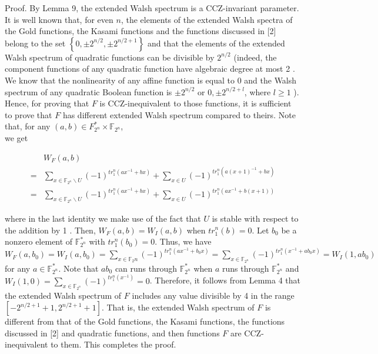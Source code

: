 \documentclass[10pt]{article}
\begin{document}
Proof. By Lemma 9, the extended Walsh spectrum is a CCZ-invariant parameter. It is well known that, for even $n$, the elements of the extended Walsh spectra of the Gold functions, the Kasami functions and the functions discussed in [2] belong to the set $\left\{0, \pm 2^{n / 2}, \pm 2^{n / 2+1}\right\}$ and that the elements of the extended Walsh spectrum of quadratic functions can be divisible by $2^{n / 2}$ (indeed, the component functions of any quadratic function have algebraic degree at most 2 . We know that the nonlinearity of any affine function is equal to 0 and the Walsh spectrum of any quadratic Boolean function is $\pm 2^{n / 2}$ or $0, \pm 2^{n / 2+l}$, where $l \geq 1$ ). Hence, for proving that $F$ is CCZ-inequivalent to those functions, it is sufficient to prove that $F$ has different extended Walsh spectrum compared to theirs. Note that, for any $(a, b) \in F_{2^{n}}^{*} \times \mathbb{F}_{2^{n}}$,\\
we get

$$
\begin{aligned}
& W_{F}(a, b) \\
= & \sum_{x \in \mathbb{F}_{2^{n}} \backslash U}(-1)^{t r_{1}^{n}\left(a x^{-1}+b x\right)}+\sum_{x \in U}(-1)^{t r_{1}^{n}\left(a(x+1)^{-1}+b x\right)} \\
= & \sum_{x \in \mathbb{F}_{2^{n}} \backslash U}(-1)^{t r_{1}^{n}\left(a x^{-1}+b x\right)}+\sum_{x \in U}(-1)^{t r_{1}^{n}\left(a x^{-1}+b(x+1)\right)}
\end{aligned}
$$

where in the last identity we make use of the fact that $U$ is stable with respect to the addition by 1 . Then, $W_{F}(a, b)=W_{I}(a, b)$ when $t r_{1}^{n}(b)=0$. Let $b_{0}$ be a nonzero element of $\mathbb{F}_{2^{n}}^{*}$ with $t r_{1}^{n}\left(b_{0}\right)=0$. Thus, we have $W_{F}\left(a, b_{0}\right)=W_{I}\left(a, b_{0}\right)=\sum_{x \in \mathbb{F}_{2} n}(-1)^{t r_{1}^{n}\left(a x^{-1}+b_{0} x\right)}= \sum_{x \in \mathbb{F}_{2^{n}}}(-1)^{t r_{1}^{n}\left(x^{-1}+a b_{0} x\right)}=W_{I}\left(1, a b_{0}\right)$ for any $a \in \mathbb{F}_{2^{n}}^{*}$. Note that $a b_{0}$ can runs through $\mathbb{F}_{2^{n}}^{*}$ when $a$ runs through $\mathbb{F}_{2^{n}}^{*}$ and $W_{I}(1,0)=\sum_{x \in \mathbb{F}_{2^{n}}}(-1)^{t r_{1}^{n}\left(x^{-1}\right)}=0$. Therefore, it follows from Lemma 4 that the extended Walsh spectrum of $F$ includes any value divisible by 4 in the range $\left[-2^{n / 2+1}+1,2^{n / 2+1}+1\right]$. That is, the extended Walsh spectrum of $F$ is different from that of the Gold functions, the Kasami functions, the functions discussed in [2] and quadratic functions, and then functions $F$ are CCZ-inequivalent to them. This completes the proof.
\end{document}
